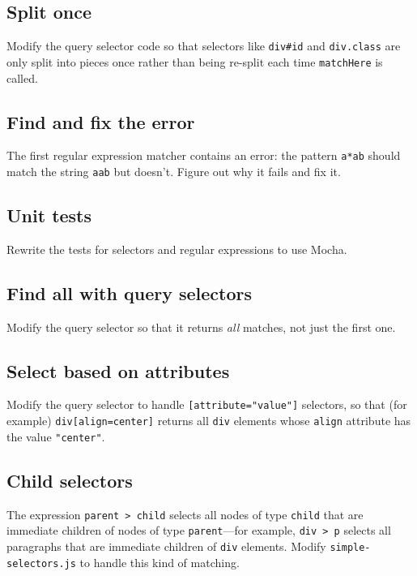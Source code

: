 \documentclass[krantzl]{krantz}
\begin{document}
\subsection*{Split once}


Modify the query selector code so that selectors like \texttt{div\#id} and \texttt{div.class} are only split into pieces once
rather than being re-split each time \texttt{matchHere} is called.

\subsection*{Find and fix the error}


The first regular expression matcher contains an error:
the pattern \texttt{{\textquotesingle}a*ab{\textquotesingle}} should match the string \texttt{{\textquotesingle}aab{\textquotesingle}} but doesn’t.
Figure out why it fails and fix it.

\subsection*{Unit tests}


Rewrite the tests for selectors and regular expressions to use Mocha.

\subsection*{Find all with query selectors}


Modify the query selector so that it returns \emph{all} matches, not just the first one.

\subsection*{Select based on attributes}


Modify the query selector to handle \texttt{[attribute="value"]} selectors,
so that (for example) \texttt{div[align=center]} returns all \texttt{div} elements
whose \texttt{align} attribute has the value \texttt{"center"}.

\subsection*{Child selectors}


The expression \texttt{parent > child} selects all nodes of type \texttt{child}
that are immediate children of nodes of type \texttt{parent}—for example,
\texttt{div > p} selects all paragraphs that are immediate children of \texttt{div} elements.
Modify \texttt{simple-selectors.js} to handle this kind of matching.
\end{document}
